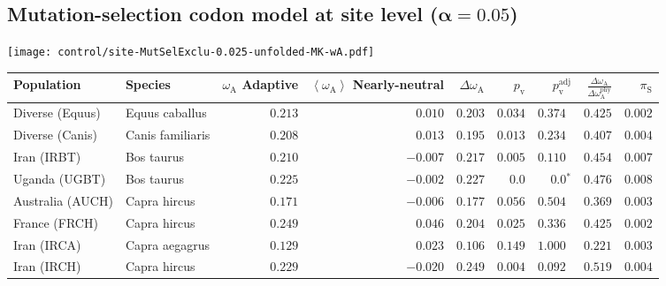 \subsection{Mutation-selection codon model at site level ($\bm{\alpha=0.05}$)}
\begin{center}
    \texttt{[image: control/site-MutSelExclu-0.025-unfolded-MK-wA.pdf]}
    \begin{adjustbox}{width = 1\textwidth}
        \begin{tabular}{|l|l|r|r|r|r|r|r|r|}
            \toprule
            Population & Species & \specialcell{$\omega_{\mathrm{A}}$ \\ Adaptive}                & \specialcell{$\left< \omega_{\mathrm{A}} \right>$ \\ Nearly-neutral}                & $\Delta \omega_{\mathrm{A}} $    & $p_{\mathrm{v}}$ & $p_{\mathrm{v}}^{\mathrm{adj}}$  & $\frac{\Delta\omega_{\mathrm{A}}}{\Delta\omega_{\mathrm{A}}^{\mathrm{phy}}}$ & $\pi_{\textrm{S}}$ \\
            \midrule
            Diverse (Equus)                    & Equus caballus          & $ 0.213$ & $ 0.010$  & $ 0.203$ & $ 0.034$ & $ 0.374~~$        & $ 0.425$ & $ 0.002$ \\
            Diverse (Canis)                  & Canis familiaris          & $ 0.208$ & $ 0.013$  & $ 0.195$ & $ 0.013$    & $ 0.234~~$    & $ 0.407$ & $ 0.004$ \\
            Iran (IRBT)               & Bos taurus        & $ 0.210$ & $-0.007$  & $ 0.217$ & $ 0.005$ & $ 0.110~~$        & $ 0.454$ & $ 0.007$ \\
            Uganda (UGBT)                  & Bos taurus        & $ 0.225$ & $-0.002$  & $ 0.227$ & $0.0$ & $\bm{0.0{^*}}$        & $ 0.476$ & $ 0.008$ \\
            Australia (AUCH)                    & Capra hircus      & $ 0.171$ & $-0.006$  & $ 0.177$ & $ 0.056$ & $ 0.504~~$        & $ 0.369$ & $ 0.003$ \\
            France (FRCH)                    & Capra hircus        & $ 0.249$ & $ 0.046$  & $ 0.204$ & $ 0.025$ & $ 0.336~~$        & $ 0.425$ & $ 0.002$ \\
            Iran (IRCA)                   & Capra aegagrus        & $ 0.129$ & $ 0.023$  & $ 0.106$ & $ 0.149$ & $ 1.000~~$        & $ 0.221$ & $ 0.003$ \\
            Iran (IRCH)                 & Capra hircus        & $ 0.229$ & $-0.020$  & $ 0.249$ & $ 0.004$ & $ 0.092~~$        & $ 0.519$ & $ 0.004$ \\

\end{tabular}
\end{adjustbox}
\end{center}
